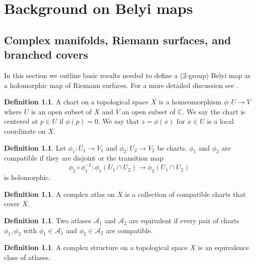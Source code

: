 \documentclass{dcthesis}
\newcommand{\CC}{\mathbb C}
\newcommand{\defi}[1]{\textsf{#1}}
\numberwithin{equation}{section}
\theoremstyle{definition}
\newtheorem{definition}[equation]{Definition}
\theoremstyle{remark}
\begin{document}
\chapter{Background on Belyi maps}{\label{chapter:backgroundbelyimaps}
  \section{Complex manifolds, Riemann surfaces, and branched covers}{\label{sec:riemannsurfaces}
    In this section we outline
    basic results needed to define a ($2$-group) Belyi map
    as a holomorphic map of Riemann surfaces.
    For a more detailed discussion
    see \cite{miranda, farkas}.
    \begin{definition}
      \label{def:chart}
      A \defi{chart} on a topological space $X$
      is a homeomorphism
      $\phi\colon U\to V$
      where $U$ is an open subset of $X$
      and $V$ an open subset of $\CC$.
      We say the chart is \defi{centered}
      at $p\in U$
      if $\phi(p) = 0$.
      We say that $z = \phi(x)$ for $x\in U$
      is a \defi{local coordinate on $X$}.
    \end{definition}
    \begin{definition}
      \label{def:compatible}
      Let $\phi_1\colon U_1\to V_1$
      and $\phi_2\colon U_2\to V_2$
      be charts.
      $\phi_1$ and $\phi_2$ are
      \defi{compatible}
      if they are disjoint or
      the \defi{transition map}
      \[
        \phi_2\circ\phi_1^{-1}\colon
        \phi_1(U_1\cap U_2)\to
        \phi_2(U_1\cap U_2)
      \]
      is holomorphic.
    \end{definition}
    \begin{definition}
      \label{def:atlas}
      A \defi{complex atlas}
      on $X$ is a collection of compatible
      charts that cover $X$.
    \end{definition}
    \begin{definition}
      \label{def:equivatlas}
      Two atlases $\mathscr{A}_1$ and $\mathscr{A}_2$
      are \defi{equivalent}
      if every pair of charts
      $\phi_1, \phi_2$
      with
      $\phi_1\in\mathscr{A}_1$
      and
      $\phi_2\in\mathscr{A}_2$
      are compatible.
    \end{definition}
    \begin{definition}
      \label{def:complexstructure}
      A \defi{complex structure}
      on a topological space $X$
      is an equivalence class of atlases.
    \end{definition}
}}
\end{document}
